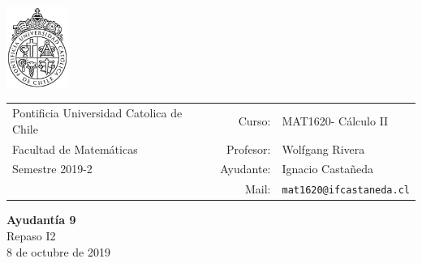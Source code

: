 \documentclass[12pt]{article}
\makeatletter
\newcommand{\ayudantia}{{\sc Ayudantía 9}}
\newcommand{\tituloayu}{Repaso I2}
\newcommand{\fecha}{8 de octubre de 2019}
\newcommand{\sigla}{MAT1620}
\newcommand{\nombre}{Cálculo II}
\newcommand{\profesor}{Wolfgang Rivera}
\newcommand{\ano}{2019}
\newcommand{\semestre}{2}
\newcommand{\mail}{mat1620@ifcastaneda.cl}
\makeatother
\begin{document}
\thispagestyle{empty}

\begin{minipage}{2cm}
	\includegraphics[width=2cm]{../../../../img/logo.pdf}
	\vspace{0.5cm}
\end{minipage}
\begin{minipage}{\linewidth}
	\begin{tabular}{lrl}
		{\scriptsize\sc Pontificia Universidad Catolica de Chile} & \hspace*{0.7in}Curso: &
		\sigla  - \nombre\\
		{\sc Facultad de Matemáticas}&
		Profesor: & \profesor \\
		{\sc Semestre \ano-\semestre} & Ayudante: & {Ignacio Castañeda}\\
		& {Mail:} & \texttt{\mail}
	\end{tabular}
\end{minipage}

\vspace{-10mm}
\begin{center}
	{\LARGE\bf \ayudantia}\\
	\vspace{0.1cm}
	{\tituloayu}\\
	\vspace{0.1cm}
	\fecha\\
	\vspace{0.4cm}
\end{center}
\end{document}
